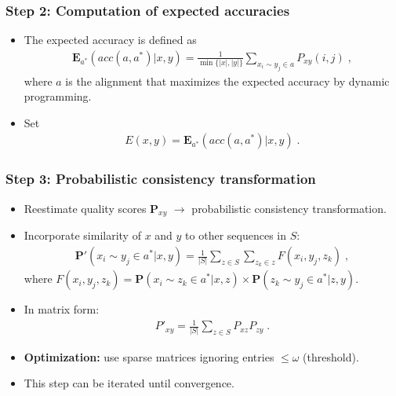 \begin{frame}
    \frametitle{Step 2: Computation of expected accuracies}
    \begin{itemize}
        \item The expected accuracy is defined as
        \begin{align*}
            \pmb{E}_{a^*} (acc(a,a^*)|x,y) = \frac{1}{\min{\{|x|,|y|\}}} \sum_{x_i\sim y_j \in a} P_{xy}(i,j) \;,
        \end{align*}
        where $a$ is the alignment that maximizes the expected accuracy by dynamic programming.
        \item Set 
        \begin{align}\label{eq:score}
            E(x,y) = \pmb{E}_{a^*} (acc(a,a^*)|x,y) \;.
        \end{align}
    \end{itemize}
\end{frame}

\begin{frame}
    \frametitle{Step 3: Probabilistic consistency transformation}
    \begin{itemize}
        \item Reestimate quality scores $\pmb{P}_{xy}$ $\rightarrow$ probabilistic consistency transformation.
        \item Incorporate similarity of $x$ and $y$ to other sequences in $S$:
        \begin{align*}
            {\pmb{P}}'(x_i \sim y_j \in a^* | x, y) = \frac{1}{|S|} \sum_{z\in S} \sum_{z_k \in z} F(x_i, y_j, z_k) \;,
        \end{align*}
        where $F(x_i, y_j, z_k) =  {\pmb{P}}(x_i \sim z_k \in a^* | x, z) \times {\pmb{P}}(z_k \sim y_j \in a^* | z, y) $.
        \item In matrix form:
        \begin{align*}
            {P'}_{xy} = \frac{1}{|S|} \sum_{z\in S} P_{xz}P_{zy} \;.
        \end{align*}
        \item \textbf{Optimization: }use sparse matrices ignoring entries $\leq \omega$ (threshold).
        \item This step can be iterated until convergence.
    \end{itemize}
\end{frame}

